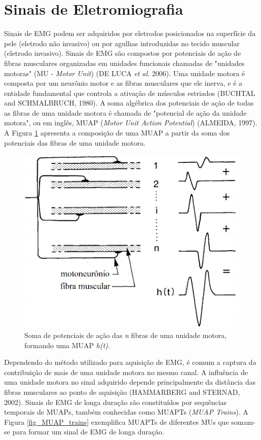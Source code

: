 \section{Sinais de Eletromiografia}

Sinais de EMG podem ser adquiridos por eletrodos posicionados na superfície da pele (eletrodo não invasivo) ou por agulhas introduzidas no tecido muscular (eletrodo invasivo). Sinais de EMG são compostos por potenciais de ação de fibras musculares organizadas em unidades funcionais chamadas de "unidades motoras" (MU - \emph{Motor Unit}) (DE LUCA \emph{et al}. 2006). Uma unidade motora é composta por um neurônio motor e as fibras musculares que ele inerva, e é a entidade fundamental que controla a ativação de músculos estriados (BUCHTAL and SCHMALBRUCH, 1980). A soma algébrica dos potenciais de ação de todas as fibras de uma unidade motora é chamada de "potencial de ação da unidade motora", ou em inglês, MUAP (\emph{Motor Unit Action Potential}) (ALMEIDA, 1997). A Figura \ref{fig_MUAP_comp} apresenta a composição de uma MUAP a partir da soma dos potenciais das fibras de uma unidade motora.

\begin{figure}[!htb]
	\caption{\label{fig_MUAP_comp}Soma de potenciais de ação das \emph{n} fibras de uma unidade motora, formando uma MUAP \emph{h(t)}.}
	\begin{center}
	    \includegraphics[width=0.75\linewidth]{./img/MUAP_oneMU.png}
	\end{center}
\end{figure}

Dependendo do método utilizado para aquisição de EMG, é comum a captura da contribuição de mais de uma unidade motora no mesmo canal. A influência de uma unidade motora no sinal adquirido depende principalmente da distância das fibras musculares ao ponto de aquisição (HAMMARBERG and STERNAD, 2002). Sinais de EMG de longa duração são constituídos por sequências temporais de MUAPs, também conhecidas como MUAPTs (\emph{MUAP Trains}). A Figura \ref{fig_MUAP_trains} exemplifica MUAPTs de diferentes MUs que somam-se para formar um sinal de EMG de longa duração.

